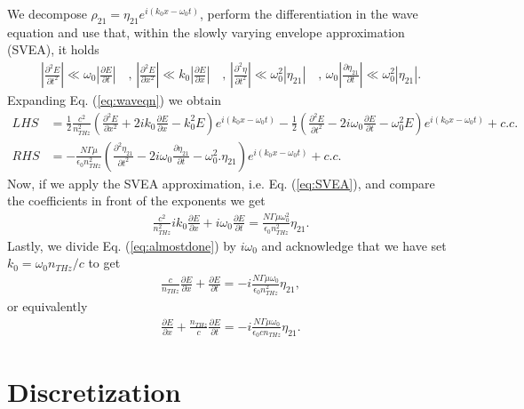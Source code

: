 \documentclass[preprint,secnumarabic,amssymb, nobibnotes, aip, prd]{revtex4-1}
\def\p{\partial}
\begin{document}
	We decompose $\rho_{21}=\eta_{21}e^{i(k_0x-\omega_0t)}$, perform the differentiation in the wave equation and use that, within the slowly varying envelope approximation (SVEA), it holds
	\begin{align}
	\label{eq:SVEA}
	\left |\frac{\p^2 E}{\p t^2}\right | \ll \omega_0\left|\frac{\p E}{\p t}\right| \quad \text{, } \left |\frac{\p^2 E}{\p x^2}\right | \ll k_0\left|\frac{\p E}{\p x}\right| \quad \text{, } \left |\frac{\p^2 \eta}{\p t^2}\right | \ll \omega_0^2 \left| \eta_{21}\right| \quad \text{, } \omega_0 \left| \frac{\p \eta_{21}}{\p t}\right| \ll  \omega_0^2\left|\eta_{21}\right|.
	\end{align}
	Expanding Eq. (\ref{eq:waveqn}) we obtain
	\begin{align}
	LHS &= \frac{1}{2} \frac{c^2}{n_{THz}^2} \left(\frac{\p^2 E}{\p x^2} +2ik_0 \frac{\p E}{\p x} -k_0^2 E\right)e^{i(k_0x-\omega_0t)} - \frac{1}{2}\left(\frac{\p^2 E}{\p t^2} -2i\omega_0 \frac{\p E}{\p t} -\omega_0^2 E\right)e^{i(k_0x-\omega_0t)} + c.c. \nonumber \\
	RHS &= -\frac{N\Gamma\mu}{\epsilon_0 n_{THz}^2} \left(\frac{\p^2 \eta_{21}}{\p t^2} -2i\omega_0 \frac{\p \eta_{21}}{\p t} -\omega_0^2. \eta_{21}\right)e^{i(k_0x-\omega_0t)}+c.c.
	\end{align}
	Now, if we apply the SVEA approximation, i.e. Eq. (\ref{eq:SVEA}), and compare the coefficients in front of the exponents we get
	\begin{align}
	\label{eq:almostdone}
	\frac{c^2}{n_{THz}^2}ik_0 \frac{\p E}{\p x}+i\omega_0 \frac{\p E}{\p t} = \frac{N\Gamma\mu\omega_0^2}{\epsilon_0 n_{THz}^2}\eta_{21}.
	\end{align}
	Lastly, we divide Eq. (\ref{eq:almostdone}) by $i\omega_0$ and acknowledge that we have set $k_0 = \omega_0 n_{THz}/c$ to get
	\begin{align}
	\label{eq:almostdone2}
	\frac{c}{n_{THz}} \frac{\p E}{\p x}+ \frac{\p E}{\p t} = -i\frac{N\Gamma\mu\omega_0}{\epsilon_0 n_{THz}^2}\eta_{21},
	\end{align}
	or equivalently
	\begin{align}
	\label{eq:almostdone3}
	\frac{\p E}{\p x}+ \frac{n_{THz}}{c} \frac{\p E}{\p t} = -i\frac{N\Gamma\mu\omega_0}{\epsilon_0 c n_{THz}}\eta_{21}.
	\end{align}
	
	\section{Discretization}
	
\end{document}
